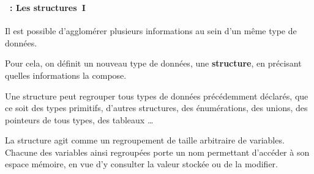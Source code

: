 \begin{frame}
  \frametitle{\secname}
  \framesubtitle{\subsecname~: Les structures~I} 

  Il est possible d'agglomérer plusieurs informations au sein d'un même type de données.
  \vspace{0.3cm}
  \par
  Pour cela, on définit un nouveau type de données, une \textbf{structure}, en précisant quelles informations
  la compose.
  \vspace{0.3cm}
  \par
  Une structure peut regrouper tous types de données précédemment déclarés, que ce soit des types primitifs, 
  d'autres structures, des énumérations, des unions, des pointeurs de tous types, des tableaux \ldots
  \vspace{0.3cm}
  \par
  La structure agit comme un regroupement de taille arbitraire de variables. Chacune des variables ainsi 
  regroupées porte un nom permettant d'accéder à son espace mémoire, en vue d'y consulter la valeur 
  stockée ou de la modifier.
\end{frame}

